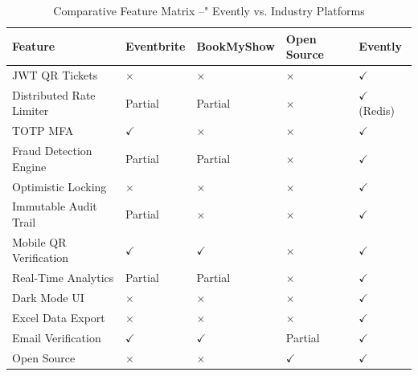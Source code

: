 \documentclass[12pt,a4paper]{report}
\begin{document}
\begin{table}[H]
    \centering
    \caption{Comparative Feature Matrix --" Evently vs. Industry Platforms}
    \vspace{0.2cm}
    \begin{tabular}{|p{4cm}|p{2.5cm}|p{2.5cm}|p{2.5cm}|p{2.5cm}|}
        \hline
        \textbf{Feature} & \textbf{Eventbrite} & \textbf{BookMyShow} & \textbf{Open Source} & \textbf{Evently} \\
        \hline
        JWT QR Tickets & $\times$ & $\times$ & $\times$ & $\checkmark$ \\
        \hline
        Distributed Rate Limiter & Partial & Partial & $\times$ & $\checkmark$ (Redis) \\
        \hline
        TOTP MFA & $\checkmark$ & $\times$ & $\times$ & $\checkmark$ \\
        \hline
        Fraud Detection Engine & Partial & Partial & $\times$ & $\checkmark$ \\
        \hline
        Optimistic Locking & $\times$ & $\times$ & $\times$ & $\checkmark$ \\
        \hline
        Immutable Audit Trail & Partial & $\times$ & $\times$ & $\checkmark$ \\
        \hline
        Mobile QR Verification & $\checkmark$ & $\checkmark$ & $\times$ & $\checkmark$ \\
        \hline
        Real-Time Analytics & Partial & Partial & $\times$ & $\checkmark$ \\
        \hline
        Dark Mode UI & $\times$ & $\times$ & $\times$ & $\checkmark$ \\
        \hline
        Excel Data Export & $\times$ & $\times$ & $\times$ & $\checkmark$ \\
        \hline
        Email Verification & $\checkmark$ & $\checkmark$ & Partial & $\checkmark$ \\
        \hline
        Open Source & $\times$ & $\times$ & $\checkmark$ & $\checkmark$ \\
        \hline
    \end{tabular}
\end{table}
\end{document}
